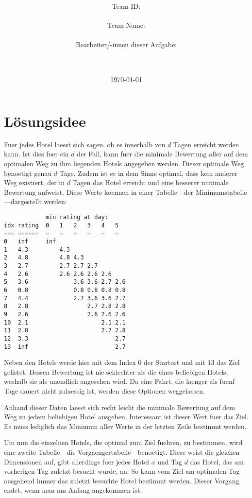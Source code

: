 \documentclass[a4paper,10pt,ngerman]{scrartcl}
\title{\textbf{\Huge\Aufgabe}}
\author{\LARGE Team-ID: \LARGE \TeamId \\\\
	    \LARGE Team-Name: \LARGE \TeamName \\\\
	    \LARGE Bearbeiter/-innen dieser Aufgabe: \\ 
	    \LARGE \Namen\\\\}
\date{\LARGE\today}
\begin{document}
\maketitle
\tableofcontents

\vspace{0.5cm}

\section{Lösungsidee}
Fuer jedes Hotel laesst sich sagen, ob es innerhalb von $d$ Tagen erreicht werden kann.
Ist dies fuer ein $d$ der Fall, kann fuer die minimale Bewertung aller auf dem optimalen Weg zu ihm liegenden Hotels angegeben werden.
Dieser optimale Weg benoetigt genau $d$ Tage.
Zudem ist er in dem Sinne optimal, dass kein anderer Weg existiert, der in $d$ Tagen das Hotel erreicht und eine besserer minimale Bewertung aufweist.
Diese Werte koennen in einer Tabelle---der Minimumstabelle---dargestellt werden:
\begin{lstlisting}
            min rating at day:
idx rating  0   1   2   3   4   5
=== ======  =   =   =   =   =   =
0   inf     inf
1   4.3         4.3
2   4.8         4.8 4.3
3   2.7         2.7 2.7 2.7
4   2.6         2.6 2.6 2.6 2.6
5   3.6             3.6 3.6 2.7 2.6
6   0.8             0.8 0.8 0.8 0.8
7   4.4             2.7 3.6 3.6 2.7
8   2.8                 2.7 2.8 2.8
9   2.6                 2.6 2.6 2.6
10  2.1                     2.1 2.1
11  2.8                     2.7 2.8
12  3.3                         2.7
13  inf                         2.7
\end{lstlisting}
Neben den Hotels werde hier mit dem Index $0$ der Startort und mit $13$ das Ziel gelistet.
Dessen Bewertung ist nie schlechter als die eines beliebigen Hotels, weshalb sie als unendlich angesehen wird.
Da eine Fahrt, die laenger als fuenf Tage dauert nicht zulaessig ist, werden diese Optionen weggelassen.

Anhand dieser Daten laesst sich recht leicht die minimale Bewertung auf dem Weg zu jedem beliebigen Hotel ausgeben.
Interessant ist dieser Wert fuer das Ziel.
Es muss lediglich das Minimum aller Werte in der letzten Zeile bestimmt werden.

Um nun die einzelnen Hotels, die optimal zum Ziel fuehren, zu bestimmen, wird eine zweite Tabelle---die Vorgaengertabelle---benoetigt.
Diese weist die gleichen Dimensionen auf, gibt allerdings fuer jedes Hotel $x$ und Tag $d$ das Hotel, das am vorherigen Tag zuletzt besucht wurde, an.
So kann vom Ziel am optimalen Tag ausgehend immer das zuletzt besuchte Hotel bestimmt werden.
Dieser Vorgang endet, wenn man am Anfang angekommen ist.
\end{document}
